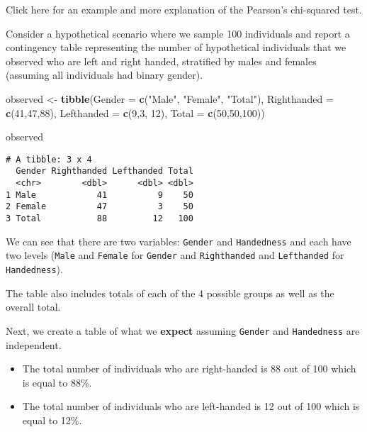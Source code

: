 \documentclass[
]{article}
\newenvironment{Shaded}{\begin{snugshade}}{\end{snugshade}}
\newcommand{\DataTypeTok}[1]{\textcolor[rgb]{0.13,0.29,0.53}{#1}}
\newcommand{\DecValTok}[1]{\textcolor[rgb]{0.00,0.00,0.81}{#1}}
\newcommand{\KeywordTok}[1]{\textcolor[rgb]{0.13,0.29,0.53}{\textbf{#1}}}
\newcommand{\NormalTok}[1]{#1}
\newcommand{\StringTok}[1]{\textcolor[rgb]{0.31,0.60,0.02}{#1}}
\providecommand{\tightlist}{%
  \setlength{\itemsep}{0pt}\setlength{\parskip}{0pt}}
\begin{document}
Click here for an example and more explanation of the Pearson's
chi-squared test.

Consider a hypothetical scenario where we sample 100 individuals and
report a contingency table representing the number of hypothetical
individuals that we observed who are left and right handed, stratified
by males and females (assuming all individuals had binary gender).

\begin{Shaded}
\begin{Highlighting}[]
\NormalTok{observed <-}\StringTok{ }\KeywordTok{tibble}\NormalTok{(}\DataTypeTok{Gender =} \KeywordTok{c}\NormalTok{(}\StringTok{"Male"}\NormalTok{, }\StringTok{"Female"}\NormalTok{, }\StringTok{"Total"}\NormalTok{), }
                   \DataTypeTok{Righthanded =} \KeywordTok{c}\NormalTok{(}\DecValTok{41}\NormalTok{,}\DecValTok{47}\NormalTok{,}\DecValTok{88}\NormalTok{), }
                   \DataTypeTok{Lefthanded =} \KeywordTok{c}\NormalTok{(}\DecValTok{9}\NormalTok{,}\DecValTok{3}\NormalTok{, }\DecValTok{12}\NormalTok{), }
                   \DataTypeTok{Total =} \KeywordTok{c}\NormalTok{(}\DecValTok{50}\NormalTok{,}\DecValTok{50}\NormalTok{,}\DecValTok{100}\NormalTok{))}

\NormalTok{observed}
\end{Highlighting}
\end{Shaded}

\begin{verbatim}
# A tibble: 3 x 4
  Gender Righthanded Lefthanded Total
  <chr>        <dbl>      <dbl> <dbl>
1 Male            41          9    50
2 Female          47          3    50
3 Total           88         12   100
\end{verbatim}

We can see that there are two variables: \texttt{Gender} and
\texttt{Handedness} and each have two levels (\texttt{Male} and
\texttt{Female} for \texttt{Gender} and \texttt{Righthanded} and
\texttt{Lefthanded} for \texttt{Handedness}).

The table also includes totals of each of the 4 possible groups as well
as the overall total.

Next, we create a table of what we \textbf{expect} assuming
\texttt{Gender} and \texttt{Handedness} are independent.

\begin{itemize}
\tightlist
\item
  The total number of individuals who are right-handed is 88 out of 100
  which is equal to 88\%.
\item
  The total number of individuals who are left-handed is 12 out of 100
  which is equal to 12\%.
\end{itemize}
\end{document}
